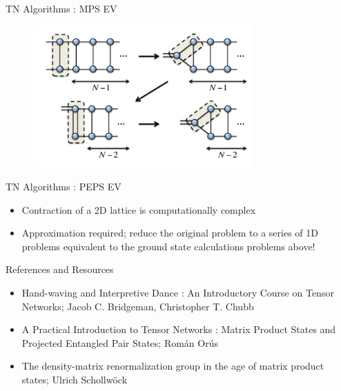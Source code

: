 \documentclass{beamer}
\begin{document}


\begin{frame}{TN Algorithms : MPS EV}
	\begin{figure}[h]
	\includegraphics[width=0.75\textwidth]{mpscontr}
	\centering
	\end{figure}
	
\end{frame}

\begin{frame}{TN Algorithms : PEPS EV}
	\begin{itemize}
	\item Contraction of a 2D lattice is computationally complex
	\item Approximation required; reduce the original problem to a series of 1D problems equivalent to the ground state calculations problems above!\\
\end{itemize}
\end{frame}

\begin{frame}{References and Resources}
	\begin{itemize}
	\item Hand-waving and Interpretive Dance : An Introductory Course on Tensor Networks; Jacob C. Bridgeman, Christopher T. Chubb
	\item A Practical Introduction to Tensor Networks : Matrix Product States and Projected Entangled Pair States; Rom\'an Or\'us
	\item The density-matrix renormalization group in the age of matrix product states; Ulrich Schollw\"ock
	\end{itemize}
\end{frame}
\end{document}
